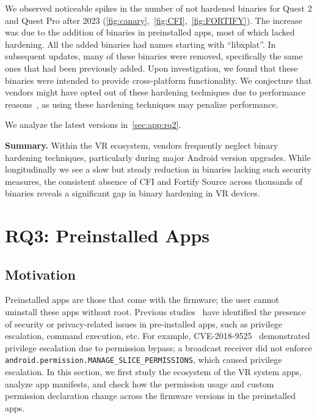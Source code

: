 \documentclass[sigconf]{acmart}
\newcommand{\bheading}[1]{{\vspace{2pt}\noindent{\textbf{#1}}}}
\newcommand{\cc}[1]{\mbox{\smaller[0.5]\texttt{#1}}}
\begin{document}
\bheading{Spikes.}
We observed noticeable spikes in the number of not hardened binaries for Quest 2 and Quest Pro after 2023 (\autoref{fig:canary},~\autoref{fig:CFI},~\autoref{fig:FORTIFY}).
The increase was due to the addition of binaries in preinstalled apps, most of which lacked hardening. All the added binaries had names starting with ``libxplat''. In subsequent updates, many of these binaries were removed, specifically the same ones that had been previously added. Upon investigation, we found that these binaries were intended to provide cross-platform functionality. 
We conjecture that vendors might have opted out of these hardening techniques due to performance reasons~\cite{dang2015performance}, as using these hardening techniques may penalize performance. 

\bheading{Latest version.}
We analyze the latest versions in~\autoref{sec:app:rq2}.

\begin{mdframed}[
  roundcorner=5pt,   linewidth=0.8pt,   linecolor=black,   backgroundcolor=gray!10,
  innertopmargin=4pt,innerbottommargin=4pt,
  innerleftmargin=4pt,
  innerrightmargin=4pt
]
\textbf{Summary.} Within the VR ecosystem, vendors frequently neglect binary hardening techniques, particularly during major Android version upgrades. While longitudinally we see a slow but steady reduction in binaries lacking such security measures, the consistent absence of CFI and Fortify Source across thousands of binaries reveals a significant gap in binary hardening in VR devices.
\end{mdframed}
 
\section{RQ3: Preinstalled Apps}
\label{s:rq3}

\subsection{Motivation}
Preinstalled apps are those that come with the firmware; the user cannot uninstall these apps without root.
Previous studies~\cite{gamba2020analysis,elsabagh2020firmscope,guo2024empirical} have identified the presence of security or privacy-related issues in pre-installed apps, such as privilege escalation, command execution, etc.
For example, CVE-2018-9525~\cite{CVE-2018-9525} demonstrated privilege escalation due to permission bypass;
a broadcast receiver did not enforce \cc{android.permission.MANAGE\_SLICE\_PERMISSIONS},
which caused privilege escalation. 
In this section, we first study the ecosystem of the VR system apps, analyze app manifests, and check how the permission usage and custom permission declaration change across the firmware versions in the preinstalled apps.
\end{document}
